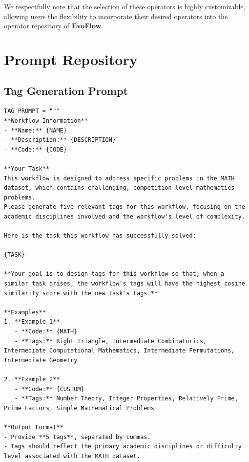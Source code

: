 \documentclass{article}
\theoremstyle{plain}
\theoremstyle{definition}
\theoremstyle{remark}
\newcommand{\ourmethod}{{\fontfamily{lmtt}\selectfont \textbf{EvoFlow}}\xspace}
\begin{document}
We respectfully note that the selection of these operators is highly customizable, allowing users the flexibility to incorporate their desired operators into the operator repository of \ourmethod.


\section{Prompt Repository}\label{app:prompt}

\subsection{Tag Generation Prompt}\label{app:prompt_tag}


\begin{tcolorbox}[notitle, sharp corners, breakable, colframe=Periwinkle, colback=white, 
       boxrule=3pt, boxsep=0.5pt, enhanced, 
       shadow={3pt}{-3pt}{0pt}{opacity=1,mygrey},
       title={Tag generation},]
       \footnotesize
       {\selectfont
\begin{lstlisting}
TAG_PROMPT = """
**Workflow Information**
- **Name:** {NAME}
- **Description:** {DESCRIPTION}
- **Code:** {CODE}

**Your Task**
This workflow is designed to address specific problems in the MATH dataset, which contains challenging, competition-level mathematics problems. 
Please generate five relevant tags for this workflow, focusing on the academic disciplines involved and the workflow's level of complexity.

Here is the task this workflow has successfully solved:

{TASK}

**Your goal is to design tags for this workflow so that, when a similar task arises, the workflow's tags will have the highest cosine similarity score with the new task's tags.**

**Examples**
1. **Example 1**
   - **Code:** {MATH}
   - **Tags:** Right Triangle, Intermediate Combinatorics, Intermediate Computational Mathematics, Intermediate Permutations, Intermediate Geometry
   
2. **Example 2**
   - **Code:** {CUSTOM}
   - **Tags:** Number Theory, Integer Properties, Relatively Prime, Prime Factors, Simple Mathematical Problems

**Output Format**
- Provide **5 tags**, separated by commas.
- Tags should reflect the primary academic disciplines or difficulty level associated with the MATH dataset.


\end{lstlisting}}
\end{tcolorbox}
\end{document}
